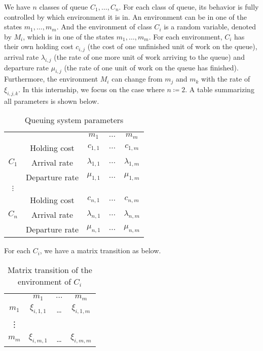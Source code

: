 \documentclass[
  a4paper, xcolor = usenames,dvipsnames]{article}
\begin{document}
We have \(n\) classes of queue \(C_{1}, \dots, C_{n}\). For each class of queue, its behavior is fully controlled by which environment it is in. An environment can be in one of the states \(m_{1}, \dots, m_{m}\). And the environment of class \(C_{i}\) is a random variable, denoted by \(M_{i}\), which is in one of the states \(m_{1}, \dots, m_{m}\). For each environment, \(C_{i}\) has their own holding cost \(c_{i, j}\) (the cost of one unfinished unit of work on the queue), arrival rate \(\lambda_{i, j}\) (the rate of one more unit of work arriving to the queue) and departure rate \(\mu_{i, j}\) (the rate of one unit of work on the queue has finished). Furthermore, the environment \(M_{i}\) can change from \(m_{j}\) and \(m_{k}\) with the rate of \(\xi_{i, j, k}\). In this internship, we focus on the case where \(n \coloneq 2\). A table summarizing all parameters is shown below.

\begin{table}[ht]
\caption{Queuing system parameters}
\begin{center}
\begin{tabular}{c c c c c}
    \hline
    \multicolumn{2}{c}{} & $m_{1}$ & $\dots$ & $m_{m}$ \\
    \cline{2-5}
    \multirow{3}{*}{$C_{1}$} &  Holding cost & $c_{1, 1}$ & $\dots$ & $c_{1, m}$ \\
    & Arrival rate & $\lambda_{1, 1}$ & $\dots$ & $\lambda_{1, m}$ \\
    & Departure rate & $\mu_{1, 1}$ & $\dots$ & $\mu_{1, m}$ \\
    \cline{2-5}
    $\vdots$  \\
    \cline{2-5}
    \multirow{3}{*}{$C_{n}$} &  Holding cost & $c_{n, 1}$ & $\dots$ & $c_{n, m}$ \\
    & Arrival rate & $\lambda_{n, 1}$ & $\dots$ & $\lambda_{n, m}$ \\
    & Departure rate & $\mu_{n, 1}$ & $\dots$ & $\mu_{n, m}$ \\
    \hline
\end{tabular}
\end{center}
\label{tab:qs-param}
\end{table}

For each \(C_{i}\), we have a matrix transition as below.

\begin{table}[ht]
\caption{Matrix transition of the environment of $C_{i}$}
\begin{center}
\begin{tabular}{c c c c}
    \hline
    & $m_{1}$ & $\dots$ & $m_{m}$ \\
    $m_{1}$ & $\xi_{i, 1, 1}$ & \dots & $\xi_{i, 1, m}$ \\
    \vdots \\
    $m_{m}$ & $\xi_{i, m, 1}$ & \dots & $\xi_{i, m, m}$ \\
    \hline
\end{tabular}
\end{center}
\label{tab:mat-transition-ci}
\end{table}
\end{document}
